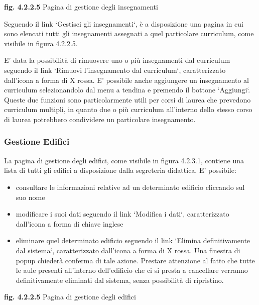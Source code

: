 \documentclass[11pt,a4paper]{article}
\begin{document}
\bigskip
\begin{center}
	\textbf{fig. 4.2.2.5} Pagina di gestione degli insegnamenti\\
\end{center}
\bigskip

Seguendo il link `Gestisci gli insegnamenti`, è a disposizione una pagina in cui sono elencati tutti gli insegnamenti assegnati a quel particolare curriculum, come visibile in figura 4.2.2.5.

E' data la possibilità di rimuovere uno o più insegnamenti dal curriculum seguendo il link `Rimuovi l'insegnamento dal curriculum`, caratterizzato dall'icona a forma di X rossa.
E' possibile anche aggiungere un insegnamento al curriculum selezionandolo dal menu a tendina e premendo il bottone `Aggiungi`.
Queste due funzioni sono particolarmente utili per corsi di laurea che prevedono curriculum multipli, in quanto due o più curriculum all'interno dello stesso corso di laurea potrebbero condividere un particolare insegnamento.

\subsubsection{Gestione Edifici}
La pagina di gestione degli edifici, come visibile in figura 4.2.3.1, contiene una lista di tutti gli edifici a disposizione dalla segreteria didattica.
E' possibile:
\begin{itemize}
 \item consultare le informazioni relative ad un determinato edificio cliccando sul suo nome
 \item modificare i suoi dati seguendo il link `Modifica i dati`, caratterizzato dall'icona a forma di chiave inglese
 \item eliminare quel determinato edificio seguendo il link `Elimina definitivamente dal sistema`, caratterizzato dall'icona a forma di X rossa. Una finestra di popup chiederà conferma di tale azione. Prestare attenzione al fatto che tutte le aule presenti all'interno dell'edificio che ci si presta a cancellare verranno definitivamente eliminati dal sistema, senza possibilità di ripristino.
\end{itemize}

\bigskip
\begin{center}
	\textbf{fig. 4.2.2.5} Pagina di gestione degli edifici\\
\end{center}
\bigskip
\end{document}
